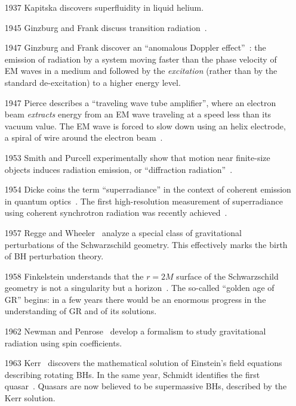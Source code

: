 \documentclass[11pt]{article}
\numberwithin{equation}{section} %
\begin{document}
\begin{itemize}[noitemsep]
\item[1937] Kapitska discovers superfluidity in liquid helium.
 
\item[1945] Ginzburg and Frank discuss transition radiation~\cite{Ginzburg:1945zz}.
 
\item[1947] Ginzburg and Frank discover an ``anomalous Doppler effect''~\cite{Ginzburg:1947}: the emission of radiation 
by a system moving faster than the phase velocity of EM waves in a medium and followed by the \emph{excitation} (rather 
than by the standard de-excitation) to a higher energy level.

\item[1947] Pierce describes a ``traveling wave tube amplifier'', where an electron beam {\it extracts} energy
from an EM wave traveling at a speed less than its vacuum value. 
The EM wave is forced to slow down using an helix electrode, a spiral of wire around the electron 
beam~\cite{PierceBook,webpagepierce}.

\item[1953] Smith and Purcell experimentally show that motion near finite-size objects induces radiation emission, or ``diffraction radiation''~\cite{Smith:1953sq}.

\item[1954] Dicke coins the term ``superradiance'' in the context of coherent emission in quantum optics~\cite{Dicke:1954zz}. The first high-resolution measurement of superradiance using coherent synchrotron radiation was recently achieved~\cite{Billinghurst:2013kna}. 
 
\item[1957] Regge and Wheeler~\cite{Regge:1957rw} analyze a special class of gravitational perturbations of the Schwarzschild
geometry. This effectively marks the birth of BH perturbation theory.

\item[1958] Finkelstein understands that the $r=2M$ surface of
the Schwarzschild geometry is not a singularity but a horizon~\cite{Finkelstein:1958zz}. The so-called ``golden age of GR'' begins: in a few
years there would be an enormous progress in the understanding of GR and of its solutions.

\item[1962] Newman and Penrose~\cite{Newman:1961qr} develop a
formalism to study gravitational radiation using spin coefficients. 

\item[1963] Kerr~\cite{Kerr:1963ud} discovers the mathematical
solution of Einstein's field equations describing rotating BHs. In the same
year, Schmidt identifies the first quasar~\cite{Schmidt:1963}. Quasars are now believed to
be supermassive BHs, described by the Kerr solution.


\end{itemize}
\end{document}
